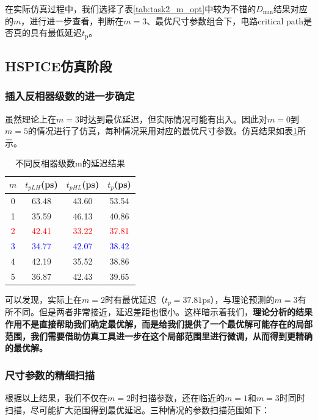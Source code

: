 \documentclass[UTF8,12pt,a4paper]{ctexart}
\begin{document}
在实际仿真过程中，我们选择了表\ref{tab:task2_m_opt}中较为不错的$D_{\text{min}}$结果对应的$m$，进行进一步查看，判断在$m=3$、最优尺寸参数组合下，电路critical path是否真的具有最低延迟$t_{\text{p}}$。

\subsection{HSPICE仿真阶段}

\subsubsection{插入反相器级数的进一步确定}

虽然理论上在$m = 3$时达到最优延迟，但实际情况可能有出入。因此对$m = 0$到$m = 5$的情况进行了仿真，每种情况采用对应的最优尺寸参数。仿真结果如表\ref{tab:task2_m}所示。

\begin{table}[htbp]
\centering
\caption{不同反相器级数m的延迟结果}
\label{tab:task2_m}
\begin{tabular}{cccc}
\toprule
$m$ & $t_{pLH}$(ps) & $t_{pHL}$(ps) & $t_p$(ps) \\
\midrule
0 & 63.48 & 43.60 & 53.54 \\
1 & 35.59 & 46.13 & 40.86 \\
\textcolor{red}{2} & \textcolor{red}{42.41} & \textcolor{red}{33.22} & \textcolor{red}{37.81} \\
\textcolor{blue}{3} & \textcolor{blue}{34.77} & \textcolor{blue}{42.07} & \textcolor{blue}{38.42} \\
4 & 42.19 & 35.52 & 38.86 \\
5 & 36.87 & 42.43 & 39.65 \\
\bottomrule
\end{tabular}
\end{table}

可以发现，实际上在$m = 2$时有最优延迟（$t_p = 37.81$ps），与理论预测的$m = 3$有所不同。但是两者非常接近，延迟差距也很小。这样暗示着我们，\textbf{理论分析的结果作用不是直接帮助我们确定最优解，而是给我们提供了一个最优解可能存在的局部范围，我们需要借助仿真工具进一步在这个局部范围里进行微调，从而得到更精确的最优解。}

\subsubsection{尺寸参数的精细扫描}

根据以上结果，我们不仅在$m = 2$时扫描参数，还在临近的$m = 1$和$m = 3$时同时扫描，尽可能扩大范围得到最优延迟。三种情况的参数扫描范围如下：
\end{document}
